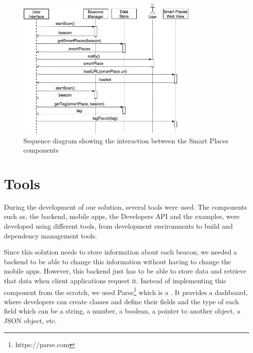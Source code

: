 \begin{figure}[!ht]
  \centering
    \includegraphics[width=0.8\textwidth, keepaspectratio]{images/client_app_sequence}
    \caption[Smart Places Sequence Diagram]{Sequence diagram showing the interaction between the Smart Places components}
    \label{fig:smart_places_sequence}
\end{figure}

\section{Tools}
\label{sec:implementation_tools}
During the development of our solution, several tools were used.
The components such as, the backend, mobile apps, the Developers \gls{API} and the examples, were developed using different tools, from development environments to build and dependency management tools.

Since this solution needs to store information about each beacon, we
needed a backend to be able to change this information without having
to change the mobile apps.
However, this backend just has to be able to store data and retrieve that
data when client applications request it.
Instead of implementing this component from the scratch, we used
Parse\footnote{https://parse.com} which is a .
It provides a dashboard, where developers can create classes
and define their fields and the type of each field which can be a string,
a number, a boolean, a pointer to another object, a \gls{JSON} object, etc.

